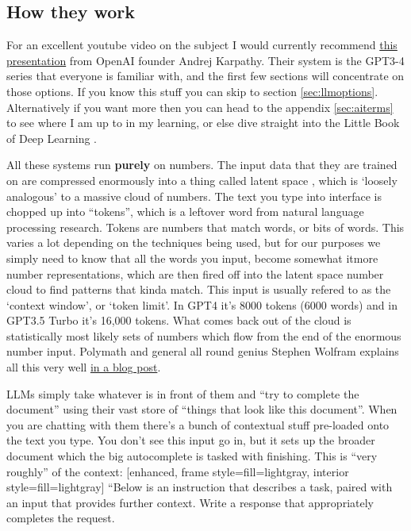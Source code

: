 \subsection{How they work}
For an excellent youtube video on the subject I would currently recommend \href{}{this presentation} from OpenAI founder Andrej Karpathy. Their system is the GPT3-4 series that everyone is familiar with, and the first few sections will concentrate on those options. If you know this stuff you can skip to section \ref{sec:llmoptions}. Alternatively if you want more then you can head to the appendix \ref{sec:aiterms} to see where I am up to in my learning, or else dive straight into the Little Book of Deep Learning \cite{fleuret2023little}. \par
All these systems run \textbf{purely} on numbers. The input data that they are trained on are compressed enormously into a thing called latent space \cite{DBLP:journals/corr/abs-2112-04895}, which is `loosely analogous' to a massive cloud of numbers. The text you type into interface is chopped up into ``tokens'', which is a leftover word from natural language processing research. Tokens are numbers that match words, or bits of words. This varies a lot depending on the techniques being used, but for our purposes we simply need to know that all the words you input, become somewhat it{more} number representations, which are then fired off into the latent space number cloud to find patterns that kinda match. This input is usually refered to as the `context window', or `token limit'. In GPT4 it's 8000 tokens (6000 words) and in GPT3.5 Turbo it's 16,000 tokens.  What comes back out of the cloud is statistically most likely sets of numbers which flow from the end of the enormous number input. Polymath and general all round genius Stephen Wolfram explains all this very well \href{https://writings.stephenwolfram.com/2023/02/what-is-chatgpt-doing-and-why-does-it-work/}{in a blog post}.\par
LLMs simply take whatever is in front of them and ``try to complete the document'' using their vast store of ``things that look like this document''. When you are chatting with them there's a bunch of contextual stuff pre-loaded onto the text you type. You don't see this input go in, but it sets up the broader document which the big autocomplete is tasked with finishing. This is ``very roughly'' of the context:
[enhanced, frame style={fill=lightgray}, interior style={fill=lightgray}]
``Below is an instruction that describes a task, paired with an input that provides further context. Write a response that appropriately completes the request.

